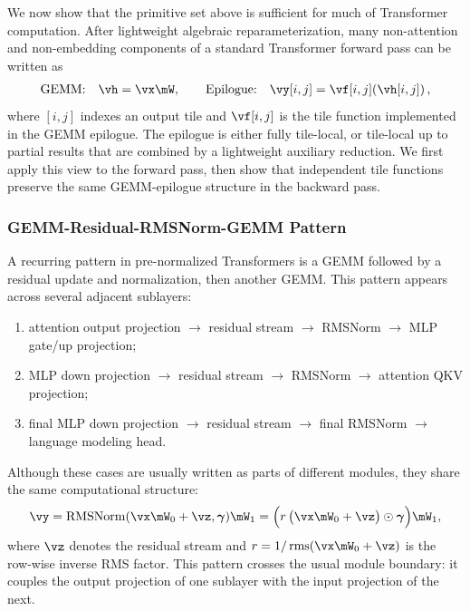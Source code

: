 We now show that the primitive set above is sufficient for much of Transformer computation. After lightweight algebraic reparameterization, many non-attention and non-embedding components of a standard Transformer forward pass can be written as
\begin{align*}
    \text{GEMM:}\quad
    \vh = \vx \mW,
    \qquad
    \text{Epilogue:}\quad
    \vy[i,j] = \vf[i,j]\!\left(\vh[i,j]\right),
\end{align*}
where $[i,j]$ indexes an output tile and $\vf[i,j]$ is the tile function implemented in the GEMM epilogue. The epilogue is either fully tile-local, or tile-local up to partial results that are combined by a lightweight auxiliary reduction. We first apply this view to the forward pass, then show that independent tile functions preserve the same GEMM-epilogue structure in the backward pass.

\subsubsection{GEMM-Residual-RMSNorm-GEMM Pattern}
\label{sec:gemm-residual-rmsnorm-gemm}

A recurring pattern in pre-normalized Transformers is a GEMM followed by a residual update and normalization, then another GEMM. This pattern appears across several adjacent sublayers:
\begin{enumerate}[leftmargin=*,nosep,nolistsep,noitemsep]
    \item attention output projection $\rightarrow$ residual stream $\rightarrow$ RMSNorm $\rightarrow$ MLP gate/up projection;
    \item MLP down projection $\rightarrow$ residual stream $\rightarrow$ RMSNorm $\rightarrow$ attention QKV projection;
    \item final MLP down projection $\rightarrow$ residual stream $\rightarrow$ final RMSNorm $\rightarrow$ language modeling head.
\end{enumerate}
Although these cases are usually written as parts of different modules, they share the same computational structure:
\begin{align*}
\vy
= \operatorname{RMSNorm}(\vx \mW_0 + \vz, \boldsymbol{\gamma}) \mW_1
= \Bigl(r \, \bigl(\vx \mW_0 + \vz\bigr) \odot \boldsymbol{\gamma}\Bigr) \mW_1,
\label{eq:gemm-res-rms-gemm}
\end{align*}
where $\vz$ denotes the residual stream and
$r = 1 / \operatorname{rms}(\vx \mW_0 + \vz)$ is the row-wise inverse RMS factor. This pattern crosses the usual module boundary: it couples the output projection of one sublayer with the input projection of the next.


